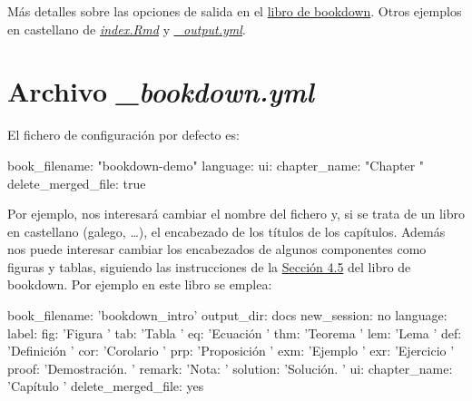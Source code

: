 \documentclass[]{book}
\newenvironment{Shaded}{\begin{snugshade}}{\end{snugshade}}
\newcommand{\StringTok}[1]{\textcolor[rgb]{0.31,0.60,0.02}{#1}}
\newcommand{\FunctionTok}[1]{\textcolor[rgb]{0.00,0.00,0.00}{#1}}
\newcommand{\AttributeTok}[1]{\textcolor[rgb]{0.77,0.63,0.00}{#1}}
\theoremstyle{definition}
\theoremstyle{definition}
\theoremstyle{definition}
\theoremstyle{remark}
\begin{document}
Más detalles sobre las opciones de salida en el
\href{https://bookdown.org/yihui/bookdown/output-formats.html}{libro de
bookdown}. Otros ejemplos en castellano de
\href{https://github.com/rubenfcasal/simbook/raw/master/index.Rmd}{\emph{index.Rmd}}
y
\href{https://github.com/rubenfcasal/simbook/blob/master/_output.yml}{\emph{\_output.yml}}.

\section{\texorpdfstring{Archivo
\emph{\_bookdown.yml}}{Archivo \_bookdown.yml}}\label{archivo-_bookdown.yml}

El fichero de configuración por defecto es:

\begin{Shaded}
\begin{Highlighting}[]
\FunctionTok{book_filename:}\AttributeTok{ }\StringTok{"bookdown-demo"}
\FunctionTok{language:}
  \FunctionTok{ui:}
    \FunctionTok{chapter_name:}\AttributeTok{ }\StringTok{"Chapter "}
\FunctionTok{delete_merged_file:}\AttributeTok{ true    }
\end{Highlighting}
\end{Shaded}

Por ejemplo, nos interesará cambiar el nombre del fichero y, si se trata
de un libro en castellano (galego, \ldots{}), el encabezado de los
títulos de los capítulos. Además nos puede interesar cambiar los
encabezados de algunos componentes como figuras y tablas, siguiendo las
instrucciones de la
\href{https://bookdown.org/yihui/bookdown/internationalization.html}{Sección
4.5} del libro de bookdown. Por ejemplo en este libro se emplea:

\begin{Shaded}
\begin{Highlighting}[]
\FunctionTok{book_filename:}\AttributeTok{ }\StringTok{'bookdown_intro'}
\FunctionTok{output_dir:}\AttributeTok{ docs}
\FunctionTok{new_session:}\AttributeTok{ no}
\FunctionTok{language:}
  \FunctionTok{label:}
    \FunctionTok{fig:}\AttributeTok{ }\StringTok{'Figura '}
    \FunctionTok{tab:}\AttributeTok{ }\StringTok{'Tabla '}
    \FunctionTok{eq:}\AttributeTok{ }\StringTok{'Ecuación '}
    \FunctionTok{thm:}\AttributeTok{ }\StringTok{'Teorema '}
    \FunctionTok{lem:}\AttributeTok{ }\StringTok{'Lema '}
    \FunctionTok{def:}\AttributeTok{ }\StringTok{'Definición '}
    \FunctionTok{cor:}\AttributeTok{ }\StringTok{'Corolario '}
    \FunctionTok{prp:}\AttributeTok{ }\StringTok{'Proposición '}
    \FunctionTok{exm:}\AttributeTok{ }\StringTok{'Ejemplo '}
    \FunctionTok{exr:}\AttributeTok{ }\StringTok{'Ejercicio '}
    \FunctionTok{proof:}\AttributeTok{ }\StringTok{'Demostración. '}
    \FunctionTok{remark:}\AttributeTok{ }\StringTok{'Nota: '}
    \FunctionTok{solution:}\AttributeTok{ }\StringTok{'Solución. '}
  \FunctionTok{ui:}
    \FunctionTok{chapter_name:}\AttributeTok{ }\StringTok{'Capítulo '}
\FunctionTok{delete_merged_file:}\AttributeTok{ yes}
\end{Highlighting}
\end{Shaded}
\end{document}
